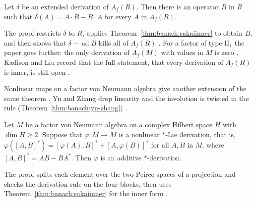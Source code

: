 \begin{theorem}\label{thm:banach:kadison-liu}
Let $\delta$ be an extended derivation of $A_f(R)$. Then there is an operator
$B$ in $R$ such that $\delta(A)=A\cdot B-B\cdot A$ for every $A$ in $A_f(R)$.
\end{theorem}

The proof restricts $\delta$ to $R$, applies
Theorem~\ref{thm:banach:sakaiinner} to obtain $B$, and then shows that
$\delta-\operatorname{ad}B$ kills all of $A_f(R)$
\cite[p.~2090]{KadisonLiu2014Murray}. For a factor of type $\mathrm{II}_1$ the
paper goes further: the only derivation of $A_f(M)$ with values in $M$ is zero
\cite[Theorem~12, p.~2091]{KadisonLiu2014Murray}. Kadison and Liu record that
the full statement, that every derivation of $A_f(R)$ is inner, is still open
\cite[p.~2090]{KadisonLiu2014Murray}.

Nonlinear maps on a factor von Neumann algebra give another extension of the
same theorem \cite[p.~1979]{YuZhang2012StarLie}. Yu and Zhang drop linearity
and the involution is twisted in the rule (Theorem~\ref{thm:banach:yu-zhang})
\cite[p.~1979]{YuZhang2012StarLie}.

\begin{theorem}\label{thm:banach:yu-zhang}
Let $M$ be a factor von Neumann algebra on a complex Hilbert space $H$ with
$\dim H\geq2$. Suppose that $\varphi\colon M\to M$ is a nonlinear $*$-Lie
derivation, that is,
$\varphi([A,B]^*)=[\varphi(A),B]^*+[A,\varphi(B)]^*$ for all $A,B$ in $M$,
where $[A,B]^*=AB-BA^*$. Then $\varphi$ is an additive $*$-derivation.
\end{theorem}

The proof splits each element over the two Peirce spaces of a projection and
checks the derivation rule on the four blocks, then uses
Theorem~\ref{thm:banach:sakaiinner} for the inner form
\cite[pp.~1990--1991]{YuZhang2012StarLie}.



